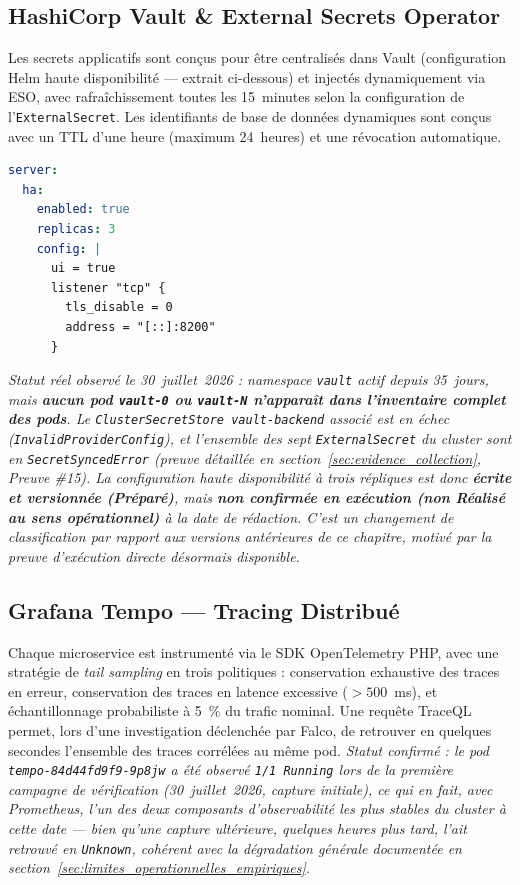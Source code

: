\subsection{HashiCorp Vault \& External Secrets Operator}
\label{subsec:vault_eso_v2}
Les secrets applicatifs sont conçus pour être centralisés dans Vault (configuration Helm haute disponibilité — extrait ci-dessous) et injectés dynamiquement via ESO, avec rafraîchissement toutes les 15~minutes selon la configuration de l'\texttt{ExternalSecret}. Les identifiants de base de données dynamiques sont conçus avec un TTL d'une heure (maximum 24~heures) et une révocation automatique.

\begin{lstlisting}[language=yaml, caption={Extrait réel de la configuration Helm haute disponibilité de Vault (\texttt{infra/helm/vault/values-production.yaml})}, label={lst:vault_ha_values_reel}]
server:
  ha:
    enabled: true
    replicas: 3
    config: |
      ui = true
      listener "tcp" {
        tls_disable = 0
        address = "[::]:8200"
      }
\end{lstlisting}

\textit{Statut réel observé le 30~juillet~2026 : namespace \texttt{vault} actif depuis 35~jours, mais \textbf{aucun pod \texttt{vault-0} ou \texttt{vault-N} n'apparaît dans l'inventaire complet des pods}. Le \texttt{ClusterSecretStore vault-backend} associé est en échec (\texttt{InvalidProviderConfig}), et l'ensemble des sept \texttt{ExternalSecret} du cluster sont en \texttt{SecretSyncedError} (preuve détaillée en section~\ref{sec:evidence_collection}, Preuve \#15). La configuration haute disponibilité à trois répliques est donc \textbf{écrite et versionnée (Préparé)}, mais \textbf{non confirmée en exécution (non Réalisé au sens opérationnel)} à la date de rédaction. C'est un changement de classification par rapport aux versions antérieures de ce chapitre, motivé par la preuve d'exécution directe désormais disponible.}

\subsection{Grafana Tempo — Tracing Distribué}
Chaque microservice est instrumenté via le SDK OpenTelemetry PHP, avec une stratégie de \textit{tail sampling} en trois politiques : conservation exhaustive des traces en erreur, conservation des traces en latence excessive ($>500$~ms), et échantillonnage probabiliste à 5~\% du trafic nominal. Une requête TraceQL permet, lors d'une investigation déclenchée par Falco, de retrouver en quelques secondes l'ensemble des traces corrélées au même pod. \textit{Statut confirmé : le pod \texttt{tempo-84d44fd9f9-9p8jw} a été observé \texttt{1/1 Running} lors de la première campagne de vérification (30~juillet~2026, capture initiale), ce qui en fait, avec Prometheus, l'un des deux composants d'observabilité les plus stables du cluster à cette date — bien qu'une capture ultérieure, quelques heures plus tard, l'ait retrouvé en \texttt{Unknown}, cohérent avec la dégradation générale documentée en section~\ref{sec:limites_operationnelles_empiriques}.}

